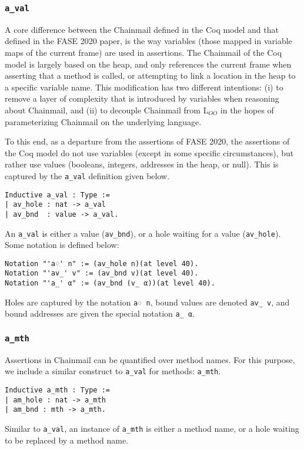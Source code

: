 \documentclass[12pt]{article}
\begin{document}
\subsubsection{\texttt{a\_val}}
A core difference between the Chainmail defined in the Coq model and that defined in the FASE 2020 paper, is the way variables (those mapped in variable maps of the current frame) are used in 
assertions. The Chainmail of the Coq model  is largely based on the heap, and only references the current frame when asserting that a method is called, or attempting to link a location in the heap 
to a specific variable name. This modification has two different intentions: (i) to remove a layer of complexity that is introduced by variables when reasoning about Chainmail, and (ii) to decouple
Chainmail from L$_{OO}$ in the hopes of parameterizing Chainmail on the underlying language. 

To this end, as a departure from the assertions of FASE 2020, the assertions of the Coq model do not use variables (except in some specific circumstances), but rather use values 
(booleans, integers, addresses in the heap, or null). This is captured by the \verb|a_val| definition given below.
\begin{verbatim}
Inductive a_val : Type :=
| av_hole : nat -> a_val
| av_bnd  : value -> a_val.
\end{verbatim}
An \verb|a_val| is either a value (\verb|av_bnd|), or a hole waiting for a value (\verb|av_hole|). Some notation is defined below:
\begin{verbatim}
Notation "'a♢' n" := (av_hole n)(at level 40).
Notation "'av_' v" := (av_bnd v)(at level 40).
Notation "'a_' α" := (av_bnd (v_ α))(at level 40).
\end{verbatim}
Holes are captured by the notation \verb|a♢ n|, bound values are denoted \verb|av_ v|, and bound addresses are given the special notation \verb|a_ α|.

\subsubsection{\texttt{a\_mth}}
Assertions in Chainmail can be quantified over method names. For this purpose, we include a similar construct to \verb|a_val| for methods: \verb|a_mth|.
\begin{verbatim}
Inductive a_mth : Type :=
| am_hole : nat -> a_mth
| am_bnd : mth -> a_mth.
\end{verbatim}
Similar to \verb|a_val|, an instance of \verb|a_mth| is either a method name, or a hole waiting to be replaced by a method name.
\end{document}
